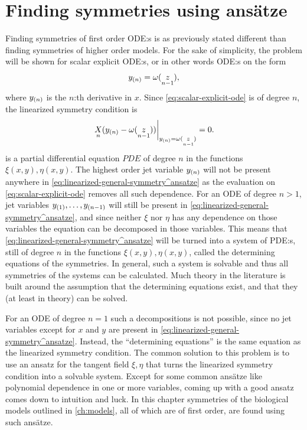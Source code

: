 \chapter{Finding symmetries using ansätze} \label{ch:ansatze}

Finding symmetries of first order ODE:s is as previously stated different than finding symmetries of higher order models.
For the sake of simplicity, the problem will be shown for scalar explicit ODE:s, or in other words ODE:s on the form
\begin{equation} \label{eq:scalar-explicit-ode}
  \prolongpart{y}{n} = \omega(\prolong{z}{n-1}),
\end{equation}
where \(\prolongpart{y}{n}\) is the \(n\):th derivative in \(x\).
Since \cref{eq:scalar-explicit-ode} is of degree \(n\), the linearized symmetry condition is
\begin{equation} \label{eq:linearized-general-symmetry^ansatze}
  \eval{\prolong{X}{n}(\prolongpart{y}{n} - \omega(\prolong{z}{n-1}))}_{\prolongpart{y}{n} = \omega(\prolong{z}{n-1})} = 0.
\end{equation}
 is a partial differential equation \(PDE\) of degree \(n\) in the functions \(\xi(x, y), \eta(x, y)\).
The highest order jet variable \(\prolongpart{y}{n}\) will not be present anywhere in \cref{eq:linearized-general-symmetry^ansatze} as the evaluation on \cref{eq:scalar-explicit-ode} removes all such dependence.
For an ODE of degree \(n > 1\), jet variables \(\prolongpart{y}{1}, \dots, \prolongpart{y}{n-1}\) will still be present in \cref{eq:linearized-general-symmetry^ansatze}, and since neither \(\xi\) nor \(\eta\) has any dependence on those variables the equation can be decomposed in those variables.
This means that \cref{eq:linearized-general-symmetry^ansatze} will be turned into a system of PDE:s, still of degree \(n\) in the functions \(\xi(x, y), \eta(x, y)\), called the determining equations of the symmetries.
In general, such a system is solvable and thus all symmetries of the systems can be calculated.
Much theory in the literature is built around the assumption that the determining equations exist, and that they (at least in theory) can be solved.

For an ODE of degree \(n = 1\) such a decompositions is not possible, since no jet variables except for \(x\) and \(y\) are present in \cref{eq:linearized-general-symmetry^ansatze}.
Instead, the \enquote{determining equations} is the same equation as the linearized symmetry condition.
The common solution to this problem is to use an ansatz for the tangent field \(\xi, \eta\) that turns the linearized symmetry condition into a solvable system.
Except for some common ansätze like polynomial dependence in one or more variables, coming up with a good ansatz comes down to intuition and luck.
In this chapter symmetries of the biological models outlined in \cref{ch:models}, all of which are of first order, are found using such ansätze.

